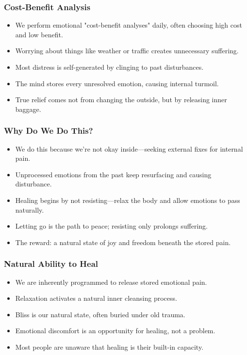 \begin{frame}[fragile]\frametitle{Cost-Benefit Analysis}
    \begin{itemize}
        \item We perform emotional "cost-benefit analyses" daily, often choosing high cost and low benefit.
        \item Worrying about things like weather or traffic creates unnecessary suffering.
        \item Most distress is self-generated by clinging to past disturbances.
        \item The mind stores every unresolved emotion, causing internal turmoil.
        \item True relief comes not from changing the outside, but by releasing inner baggage.
    \end{itemize}
\end{frame}

\begin{frame}[fragile]\frametitle{Why Do We Do This?}
    \begin{itemize}
        \item We do this because we’re not okay inside—seeking external fixes for internal pain.
        \item Unprocessed emotions from the past keep resurfacing and causing disturbance.
        \item Healing begins by not resisting—relax the body and allow emotions to pass naturally.
        \item Letting go is the path to peace; resisting only prolongs suffering.
        \item The reward: a natural state of joy and freedom beneath the stored pain.
    \end{itemize}
\end{frame}

\begin{frame}[fragile]\frametitle{Natural Ability to Heal}
    \begin{itemize}
        \item We are inherently programmed to release stored emotional pain.
        \item Relaxation activates a natural inner cleansing process.
        \item Bliss is our natural state, often buried under old trauma.
        \item Emotional discomfort is an opportunity for healing, not a problem.
        \item Most people are unaware that healing is their built-in capacity.
    \end{itemize}
\end{frame}

